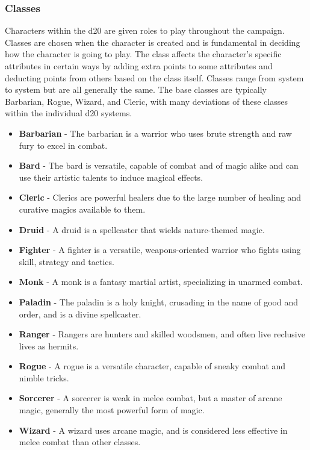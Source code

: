 \documentclass[12pt,a4paper]{report}
\begin{document}
		\subsubsection{Classes}
			Characters within the d20 are given roles to play throughout the campaign. Classes are chosen when the character is created and is fundamental in deciding how the character is going to play. The class affects the character's specific attributes in certain ways by adding extra points to some attributes and deducting points from others based on the class itself. Classes range from system to system but are all generally the same. The base classes are typically Barbarian, Rogue, Wizard, and Cleric, with many deviations of these classes within the individual d20 systems.
			\begin{itemize}
				\item \textbf{Barbarian} - The barbarian is a warrior who uses brute strength and raw fury to excel in combat.
				\item \textbf{Bard} - The bard is versatile, capable of combat and of magic alike and can use their artistic talents to induce magical effects.
				\item \textbf{Cleric} - Clerics are powerful healers due to the large number of healing and curative magics available to them. 
				\item \textbf{Druid} - A druid is a spellcaster that wields nature-themed magic.
				\item \textbf{Fighter} - A fighter is a versatile, weapons-oriented warrior who fights using skill, strategy and tactics.
				\item \textbf{Monk} - A monk is a fantasy martial artist, specializing in unarmed combat.
				\item \textbf{Paladin} - The paladin is a holy knight, crusading in the name of good and order, and is a divine spellcaster.
				\item \textbf{Ranger} - Rangers are hunters and skilled woodsmen, and often live reclusive lives as hermits.
				\item \textbf{Rogue} - A rogue is a versatile character, capable of sneaky combat and nimble tricks.
				\item \textbf{Sorcerer} - A sorcerer is weak in melee combat, but a master of arcane magic, generally the most powerful form of magic. 
				\item \textbf{Wizard} - A wizard uses arcane magic, and is considered less effective in melee combat than other classes.
			\end{itemize}
		\newpage
\end{document}
